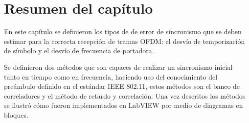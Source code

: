 \color{black}

\section{Resumen del capítulo}

En este capítulo se definieron los tipos de de error de sincronismo que se deben estimar para la correcta recepción de tramas OFDM: el desvío de temporización de símbolo y el desvío de frecuencia de portadora. 

Se definieron dos métodos que son capaces de realizar un sincronismo inicial tanto en tiempo como en frecuencia, haciendo uso del conocimiento del preámbulo definido en el estándar IEEE 802.11, estos métodos son el banco de correladores y el método de retardo y correlación. Una vez descritos los métodos se ilustró cómo fueron implementados en LabVIEW por medio de diagramas en bloques. 

